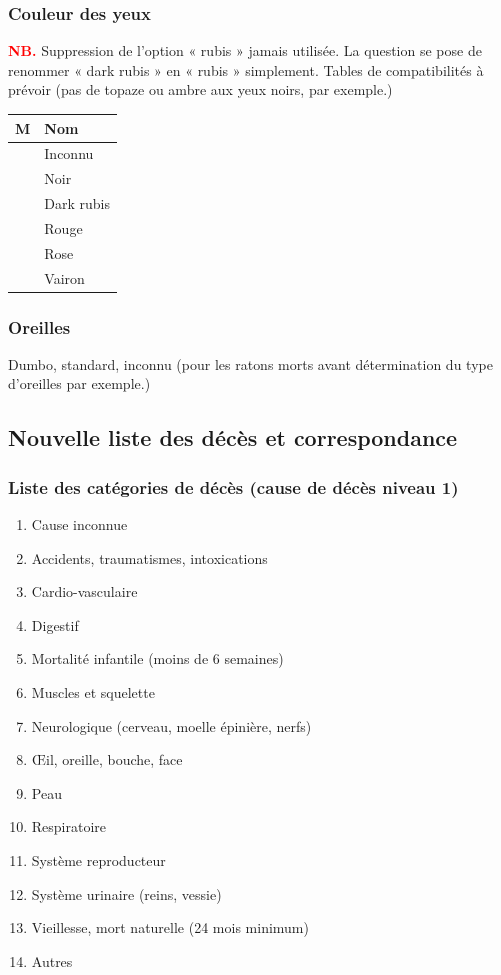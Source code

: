 \documentclass[a4paper,10pt]{article}
\newcommand\desire[1]{\noindent\textbf{\textcolor{red}{#1}}}
\begin{document}
\subsubsection{Couleur des yeux}
\desire{NB.} Suppression de l'option « rubis » jamais utilisée. La question se pose de renommer « dark rubis » en « rubis » simplement. Tables de compatibilités à prévoir (pas de topaze ou ambre aux yeux noirs, par exemple.)   
   
\begin{longtable}{|c|l|}\hline
\textbf{M} & \textbf{Nom} \\\hline
 & Inconnu \\\hline
 & Noir \\\hline
 & Dark rubis \\\hline
 & Rouge \\\hline
 & Rose \\\hline
 & Vairon \\\hline
\end{longtable}

\subsubsection{Oreilles}
Dumbo, standard, inconnu (pour les ratons morts avant détermination du type d'oreilles par exemple.)  

\subsection{Nouvelle liste des décès et correspondance}
\subsubsection{Liste des catégories de décès (cause de décès niveau 1)}

\begin{enumerate}
\item Cause inconnue
\item Accidents, traumatismes, intoxications
\item Cardio-vasculaire
\item Digestif
\item Mortalité infantile (moins de 6 semaines)
\item Muscles et squelette
\item Neurologique (cerveau, moelle épinière, nerfs)
\item Œil, oreille, bouche, face
\item Peau
\item Respiratoire
\item Système reproducteur
\item Système urinaire (reins, vessie)
\item Vieillesse, mort naturelle (24 mois minimum)
\item Autres
\end{enumerate}
\end{document}
